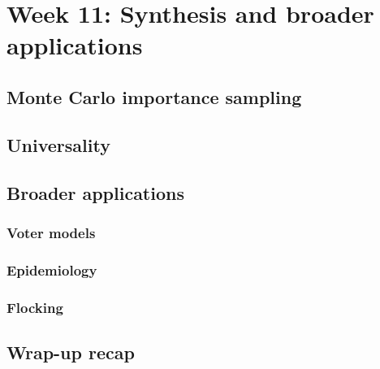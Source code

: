 \renewcommand{\thisweek}{MATH327 Week 11}
\renewcommand{\moddate}{Last modified 1 May 2021}
\setcounter{section}{11}
\setcounter{subsection}{0}
{}
\section*{Week 11: Synthesis and broader applications}
\subsection{Monte Carlo importance sampling}




\newpage
\subsection{Universality}




\newpage
\subsection{Broader applications}
\subsubsection*{Voter models}


\subsubsection*{Epidemiology}


\subsubsection*{Flocking}




\newpage
\subsection{Wrap-up recap}

